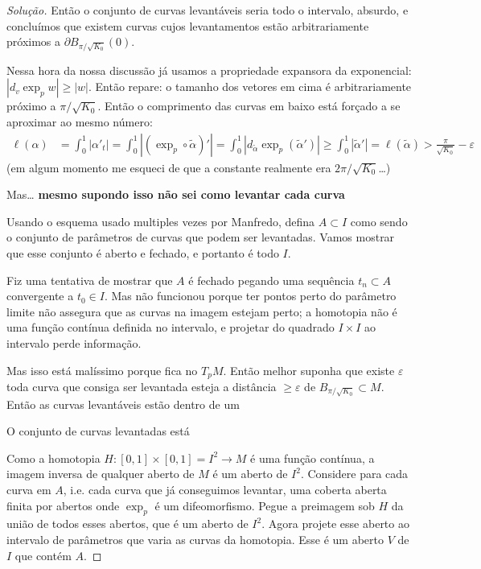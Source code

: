 \begin{proof}[Solução]
Então o conjunto de curvas levantáveis seria todo o intervalo, absurdo, e concluímos que existem curvas cujos levantamentos estão arbitrariamente próximos a \(\partial B_{\pi/\sqrt{K_0}}(0)\).

Nessa hora da nossa discussão já usamos a propriedade expansora da exponencial: \(|d_v \operatorname{exp}_pw|\geq |w|\). Então repare: o tamanho dos vetores em cima é arbitrariamente próximo a \(\pi/\sqrt{K_0}\). Então o comprimento das curvas em baixo está forçado a se aproximar ao mesmo número:
\begin{align*}
\ell(\alpha)&=\int_0^1 |\alpha'_t|=\int_0^1 |(\operatorname{exp}_p \circ \tilde{\alpha})'|=\int_0^1 |d_{\tilde{\alpha}}\operatorname{exp}_p(\tilde{\alpha}')|\geq \int_0^1|\tilde{\alpha}'|=\ell(\tilde{\alpha})>\frac{\pi}{\sqrt{K_0}}-\varepsilon
\end{align*}
(em algum momento me esqueci de que a constante realmente era \(2\pi/\sqrt{K_0}\)…)
\iffalse

Mas… \textbf{mesmo supondo isso não sei como levantar cada curva} 


Usando o esquema usado multiples vezes por Manfredo, defina \(A \subset I\) como sendo o conjunto de parâmetros de curvas que podem ser levantadas. Vamos mostrar que esse conjunto é aberto e fechado, e portanto é todo \(I\).

Fiz uma tentativa de mostrar que \(A\) é fechado pegando uma sequência \(t_n \subset A\) convergente a \(t_0 \in I\). Mas não funcionou porque ter pontos perto do parâmetro limite não assegura que as curvas na imagem estejam perto; a homotopia não é uma função contínua definida no intervalo, e projetar do quadrado \(I \times I\) ao intervalo perde informação.

Mas isso está malíssimo porque fica no \(T_pM\). Então melhor suponha que existe \(\varepsilon\) toda curva que consiga ser levantada esteja a distância \(\geq \varepsilon\) de \(B_{\pi/\sqrt{K_0}}\subset M\). Então as curvas levantáveis estão dentro de um 

O conjunto de curvas levantadas está 


Como a homotopia \(H:[0,1]\times[0,1]=I^2 \to M\) é uma função contínua, a imagem inversa de qualquer aberto de \(M\) é um aberto de \(I^2\). Considere para cada curva em \(A\), i.e. cada curva que já conseguimos levantar, uma coberta aberta finita por abertos onde \(\operatorname{exp}_p\) é um difeomorfismo. Pegue a preimagem sob \(H\) da união de todos esses abertos, que é um aberto de \(I^2\). Agora projete esse aberto ao intervalo de parâmetros que varia as curvas da homotopia. Esse é um aberto \(V\) de \(I\) que contém \(A\).


\end{proof}
